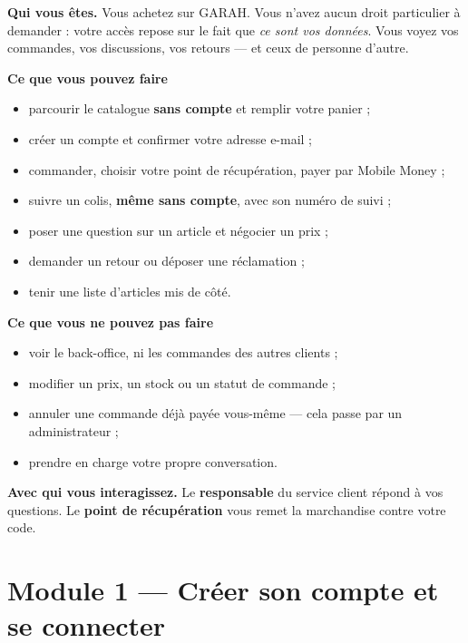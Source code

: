 \documentclass[11pt,a4paper]{report}
\begin{document}
\begin{roleBox}
\textbf{Qui vous êtes.} Vous achetez sur GARAH. Vous n'avez aucun droit
particulier à demander : votre accès repose sur le fait que \emph{ce sont vos
données}. Vous voyez vos commandes, vos discussions, vos retours — et ceux de
personne d'autre.

\medskip
\textbf{Ce que vous pouvez faire}
\begin{itemize}[leftmargin=*,itemsep=2pt,topsep=3pt]
  \item parcourir le catalogue \textbf{sans compte} et remplir votre panier ;
  \item créer un compte et confirmer votre adresse e-mail ;
  \item commander, choisir votre point de récupération, payer par Mobile Money ;
  \item suivre un colis, \textbf{même sans compte}, avec son numéro de suivi ;
  \item poser une question sur un article et négocier un prix ;
  \item demander un retour ou déposer une réclamation ;
  \item tenir une liste d'articles mis de côté.
\end{itemize}

\medskip
\textbf{Ce que vous ne pouvez pas faire}
\begin{itemize}[leftmargin=*,itemsep=2pt,topsep=3pt]
  \item voir le back-office, ni les commandes des autres clients ;
  \item modifier un prix, un stock ou un statut de commande ;
  \item annuler une commande déjà payée vous-même — cela passe par un
        administrateur ;
  \item prendre en charge votre propre conversation.
\end{itemize}

\medskip
\textbf{Avec qui vous interagissez.} Le \textbf{responsable} du service client
répond à vos questions. Le \textbf{point de récupération} vous remet la
marchandise contre votre code.
\end{roleBox}

\section{Module 1 — Créer son compte et se connecter}
\end{document}
